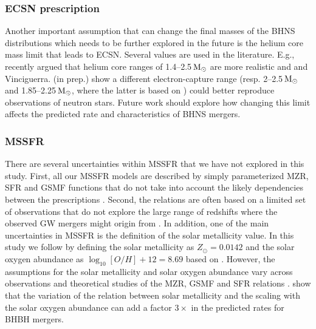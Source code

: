 \documentclass[twocolumn]{aastex63}
\newcommand{\floor}[1]{\textbf{\textcolor{magenta}{[Floor: #1]}}}
\newcommand\bhnsSingle{BHNS\xspace}
\newcommand{\Msun}{\ensuremath{\,\rm{M}_{\odot}}\xspace}
\begin{document}
\subsubsection{ECSN prescription}
Another important assumption that can change the final masses of the \bhnsSingle distributions which needs to be further explored in the future is the helium core mass limit that leads to \ac{ECSN}. Several values are used in the literature. E.g., recently \citet{2004ApJ...612.1044P} argued  that helium core ranges of 1.4--2.5\Msun are more realistic and \citet{2015ApJ...801...32A} and Vinciguerra. (in prep.) show a different electron-capture range (resp. 2--2.5\Msun and 1.85--2.25\Msun, where the latter is based on \citealt{2008ApJS..174..223B}) could better reproduce observations of neutron stars. 
Future work should explore how changing this limit affects the predicted rate and characteristics of \bhnsSingle mergers.  



%
%
%











%
\subsubsection{MSSFR}
There are several uncertainties within \ac{MSSFR} that we have not explored in this study. 
First, all our \ac{MSSFR} models are described by simply parameterized MZR, \ac{SFR}  and \ac{GSMF} functions that do not take into account the likely dependencies between the prescriptions \citep[e.g.][]{2020arXiv200106025K}. 
Second, the relations are often based on a limited set of observations that do not explore the large range of redshifts where the observed \ac{GW} mergers might origin from \citep[e.g.][]{2020ApJ...893..111L}. 
In addition, one of the main uncertainties in \ac{MSSFR} is the definition of the solar metallicity value.  In this study we follow  \citet{2019MNRAS.490.3740N} by defining the solar metallicity as $Z_{\odot}=0.0142$ and the solar oxygen abundance as $\log_{10}[O/H]+12 = 8.69$ based on \citet{2009ARA&A..47..481A}. However, the assumptions for the solar metallicity and solar oxygen abundance vary across observations and theoretical studies of the MZR, \ac{GSMF} and \ac{SFR}  relations \citep[e.g.,][]{2019MNRAS.488.5300C}.  \citet{2019MNRAS.490.3740N} show that the variation of the relation between solar metallicity and the scaling with the solar oxygen abundance can add a  factor $3\times$ in the predicted rates for \ac{BHBH} mergers. 
\end{document}

